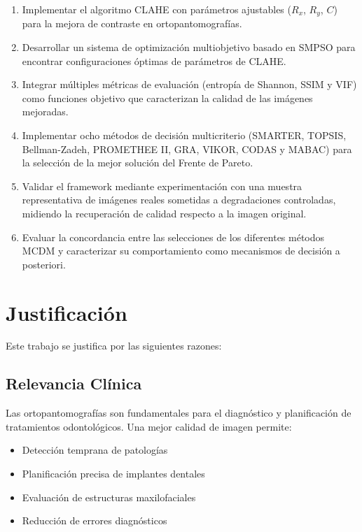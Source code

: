 \begin{enumerate}
    \item Implementar el algoritmo CLAHE con parámetros ajustables ($R_x$, $R_y$, $C$) para la mejora de contraste en ortopantomografías.

    \item Desarrollar un sistema de optimización multiobjetivo basado en SMPSO para encontrar configuraciones óptimas de parámetros de CLAHE.

    \item Integrar múltiples métricas de evaluación (entropía de Shannon, SSIM y VIF) como funciones objetivo que caracterizan la calidad de las imágenes mejoradas.

    \item Implementar ocho métodos de decisión multicriterio (SMARTER, TOPSIS, Bellman-Zadeh, PROMETHEE II, GRA, VIKOR, CODAS y MABAC) para la selección de la mejor solución del Frente de Pareto.

    \item Validar el framework mediante experimentación con una muestra representativa de imágenes reales sometidas a degradaciones controladas, midiendo la recuperación de calidad respecto a la imagen original.

    \item Evaluar la concordancia entre las selecciones de los diferentes métodos MCDM y caracterizar su comportamiento como mecanismos de decisión a posteriori.
\end{enumerate}

\section{Justificación}

Este trabajo se justifica por las siguientes razones:

\subsection{Relevancia Clínica}

Las ortopantomografías son fundamentales para el diagnóstico y planificación de tratamientos odontológicos. Una mejor calidad de imagen permite:
\begin{itemize}
    \item Detección temprana de patologías
    \item Planificación precisa de implantes dentales
    \item Evaluación de estructuras maxilofaciales
    \item Reducción de errores diagnósticos
\end{itemize}

